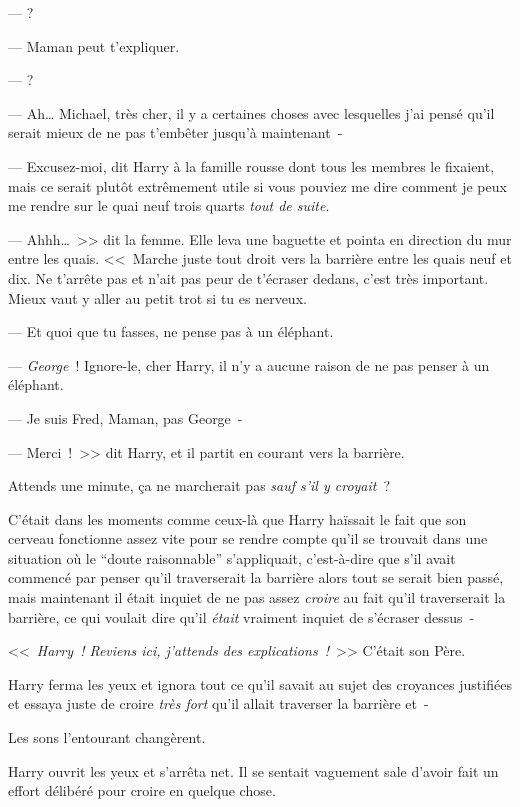 ---  ?

--- Maman peut t'expliquer.

---  ?

--- Ah… Michael, très cher, il y a certaines choses avec lesquelles j'ai pensé qu'il serait mieux de ne pas t'embêter jusqu'à maintenant~-

--- Excusez-moi, dit Harry à la famille rousse dont tous les membres le fixaient, mais ce serait plutôt extrêmement utile si vous pouviez me dire comment je peux me rendre sur le quai neuf trois quarts \emph{tout de suite}.

--- Ahhh…~>> dit la femme. Elle leva une baguette et pointa en direction du mur entre les quais. <<~Marche juste tout droit vers la barrière entre les quais neuf et dix. Ne t'arrête pas et n'ait pas peur de t'écraser dedans, c'est très important. Mieux vaut y aller au petit trot si tu es nerveux.

--- Et quoi que tu fasses, ne pense pas à un éléphant.

--- \emph{George}~! Ignore-le, cher Harry, il n'y a aucune raison de ne pas penser à un éléphant.

--- Je suis Fred, Maman, pas George~-

--- Merci~!~>> dit Harry, et il partit en courant vers la barrière.

Attends une minute, ça ne marcherait pas \emph{sauf s'il y croyait}~?

C'était dans les moments comme ceux-là que Harry haïssait le fait que son cerveau fonctionne assez vite pour se rendre compte qu'il se trouvait dans une situation où le “doute raisonnable” s'appliquait, c'est-à-dire que s'il avait commencé par penser qu'il traverserait la barrière alors tout se serait bien passé, mais maintenant il était inquiet de ne pas assez \emph{croire} au fait qu'il traverserait la barrière, ce qui voulait dire qu'il \emph{était} vraiment inquiet de s'écraser dessus~-

<<~\emph{Harry~! Reviens ici, j'attends des explications~!}~>> C'était son Père.

Harry ferma les yeux et ignora tout ce qu'il savait au sujet des croyances justifiées et essaya juste de croire \emph{très fort} qu'il allait traverser la barrière et~-

Les sons l'entourant changèrent.

Harry ouvrit les yeux et s'arrêta net. Il se sentait vaguement sale d'avoir fait un effort délibéré pour croire en quelque chose.

